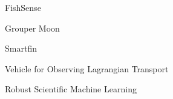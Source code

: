 \item FishSense
\item Grouper Moon
\item Smartfin
\item Vehicle for Observing Lagrangian Transport
\item Robust Scientific Machine Learning
